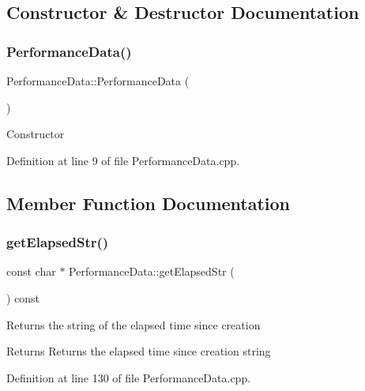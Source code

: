 \subsection{Constructor \& Destructor Documentation}
\mbox{\label{class_performance_data_a7766088fec48f94afcf784c027e0ee5d}} 
\subsubsection{\texorpdfstring{Performance\+Data()}{PerformanceData()}}
{\footnotesize\ttfamily Performance\+Data\+::\+Performance\+Data (\begin{DoxyParamCaption}{ }\end{DoxyParamCaption})}

Constructor 

Definition at line 9 of file Performance\+Data.\+cpp.



\subsection{Member Function Documentation}
\mbox{\label{class_performance_data_a083aeabd3aa06b3420b2afdbc6e0e3d1}} 
\subsubsection{\texorpdfstring{get\+Elapsed\+Str()}{getElapsedStr()}}
{\footnotesize\ttfamily const char $\ast$ Performance\+Data\+::get\+Elapsed\+Str (\begin{DoxyParamCaption}{ }\end{DoxyParamCaption}) const}

Returns the string of the elapsed time since creation \begin{DoxyReturn}{Returns}
Returns the elapsed time since creation string 
\end{DoxyReturn}


Definition at line 130 of file Performance\+Data.\+cpp.

\mbox{\label{class_performance_data_a54bcba973a7989024433e6d905140362}} 

